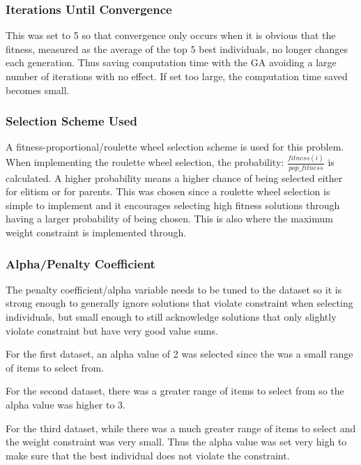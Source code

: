 \documentclass{article}
\begin{document}
\subsubsection*{Iterations Until Convergence}
This was set to 5 so that convergence only occurs when it is obvious that the fitness, measured as the average of the top 5 best individuals, no longer changes each generation. Thus saving computation time with the GA avoiding a large number of iterations with no effect. If set too large, the computation time saved becomes small.
\subsubsection*{Selection Scheme Used}
A fitness-proportional/roulette wheel selection scheme is used for this problem. When implementing the roulette wheel selection, the probability: $\frac{fitness(i)}{pop\_fitness}$ is calculated. A higher probability means a higher chance of being selected either for elitism or for parents. This was chosen since a roulette wheel selection is simple to implement and it encourages selecting high fitness solutions through having a larger probability of being chosen. This is also where the maximum weight constraint is implemented through. 
\subsubsection*{Alpha/Penalty Coefficient}
The penalty coefficient/alpha variable needs to be tuned to the dataset so it is strong enough to generally ignore solutions that violate constraint when selecting individuals, but small enough to still acknowledge solutions that only slightly violate constraint but have very good value sums. \par
\noindent For the first dataset, an alpha value of 2 was selected since the was a small range of items to select from. \par
\noindent For the second dataset, there was a greater range of items to select from so the alpha value was higher to 3. \par
\noindent For the third dataset, while there was a much greater range of items to select and the weight constraint was very small. Thus the alpha value was set very high to make sure that the best individual does not violate the constraint. \par
\end{document}

